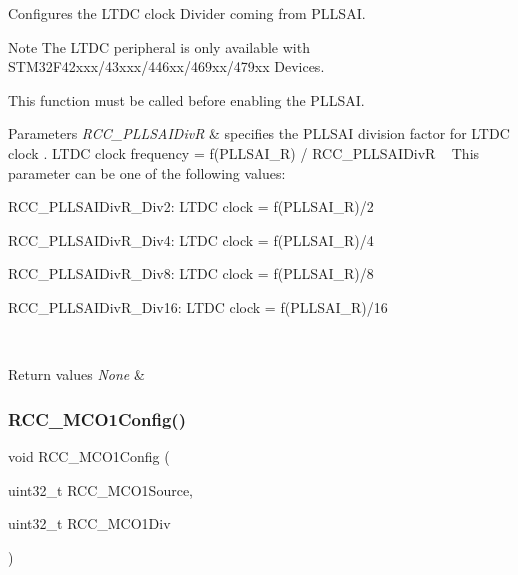 Configures the L\+T\+DC clock Divider coming from P\+L\+L\+S\+AI. 

\begin{DoxyNote}{Note}
The L\+T\+DC peripheral is only available with S\+T\+M32\+F42xxx/43xxx/446xx/469xx/479xx Devices.

This function must be called before enabling the P\+L\+L\+S\+AI.
\end{DoxyNote}

\begin{DoxyParams}{Parameters}
{\em R\+C\+C\+\_\+\+P\+L\+L\+S\+A\+I\+DivR} & specifies the P\+L\+L\+S\+AI division factor for L\+T\+DC clock . L\+T\+DC clock frequency = f(\+P\+L\+L\+S\+A\+I\+\_\+\+R) / R\+C\+C\+\_\+\+P\+L\+L\+S\+A\+I\+DivR ~\newline
 This parameter can be one of the following values\+: \begin{DoxyItemize}
\item R\+C\+C\+\_\+\+P\+L\+L\+S\+A\+I\+Div\+R\+\_\+\+Div2\+: L\+T\+DC clock = f(\+P\+L\+L\+S\+A\+I\+\_\+\+R)/2 \item R\+C\+C\+\_\+\+P\+L\+L\+S\+A\+I\+Div\+R\+\_\+\+Div4\+: L\+T\+DC clock = f(\+P\+L\+L\+S\+A\+I\+\_\+\+R)/4 \item R\+C\+C\+\_\+\+P\+L\+L\+S\+A\+I\+Div\+R\+\_\+\+Div8\+: L\+T\+DC clock = f(\+P\+L\+L\+S\+A\+I\+\_\+\+R)/8 \item R\+C\+C\+\_\+\+P\+L\+L\+S\+A\+I\+Div\+R\+\_\+\+Div16\+: L\+T\+DC clock = f(\+P\+L\+L\+S\+A\+I\+\_\+\+R)/16\end{DoxyItemize}
\\
\hline
\end{DoxyParams}

\begin{DoxyRetVals}{Return values}
{\em None} & \\
\hline
\end{DoxyRetVals}
\mbox{\label{group___r_c_c_ga15c9ecb6ef015ed008cb28e5b7a50531}} 
\subsubsection{\texorpdfstring{R\+C\+C\+\_\+\+M\+C\+O1\+Config()}{RCC\_MCO1Config()}}
{\footnotesize\ttfamily void R\+C\+C\+\_\+\+M\+C\+O1\+Config (\begin{DoxyParamCaption}\item[{uint32\+\_\+t}]{R\+C\+C\+\_\+\+M\+C\+O1\+Source,  }\item[{uint32\+\_\+t}]{R\+C\+C\+\_\+\+M\+C\+O1\+Div }\end{DoxyParamCaption})}



